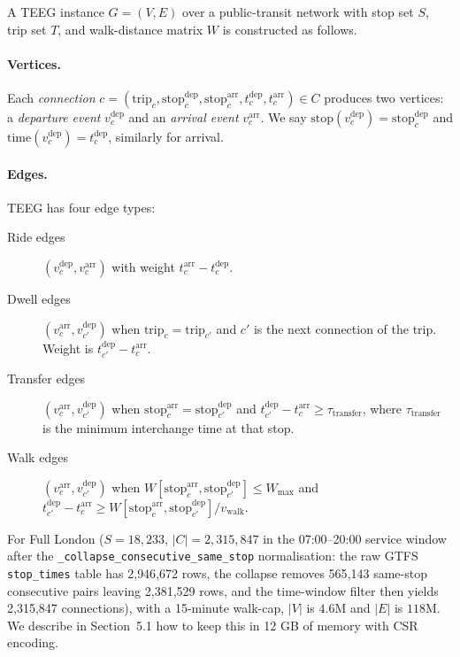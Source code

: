 \documentclass[letterpaper]{article}
\theoremstyle{definition}
\theoremstyle{plain}
\begin{document}
A TEEG instance $G = (V, E)$ over a public-transit network with stop set $S$,
trip set $T$, and walk-distance matrix $W$ is constructed as follows.

\paragraph{Vertices.} Each \emph{connection} $c = (\text{trip}_c,
\text{stop}^\text{dep}_c, \text{stop}^\text{arr}_c, t^\text{dep}_c,
t^\text{arr}_c) \in C$ produces two vertices: a \emph{departure event}
$v^\text{dep}_c$ and an \emph{arrival event} $v^\text{arr}_c$. We say
$\text{stop}(v^\text{dep}_c) = \text{stop}^\text{dep}_c$ and
$\text{time}(v^\text{dep}_c) = t^\text{dep}_c$, similarly for arrival.

\paragraph{Edges.} TEEG has four edge types:
\begin{description}
\item[Ride edges] $(v^\text{dep}_c, v^\text{arr}_c)$ with weight
$t^\text{arr}_c - t^\text{dep}_c$.
\item[Dwell edges] $(v^\text{arr}_c, v^\text{dep}_{c'})$ when
$\text{trip}_c = \text{trip}_{c'}$ and $c'$ is the next connection of the
trip. Weight is $t^\text{dep}_{c'} - t^\text{arr}_c$.
\item[Transfer edges] $(v^\text{arr}_c, v^\text{dep}_{c'})$ when
$\text{stop}^\text{arr}_c = \text{stop}^\text{dep}_{c'}$ and
$t^\text{dep}_{c'} - t^\text{arr}_c \geq \tau_\text{transfer}$, where
$\tau_\text{transfer}$ is the minimum interchange time at that stop.
\item[Walk edges] $(v^\text{arr}_c, v^\text{dep}_{c'})$ when
$W[\text{stop}^\text{arr}_c, \text{stop}^\text{dep}_{c'}] \leq W_\text{max}$
and $t^\text{dep}_{c'} - t^\text{arr}_c \geq W[\text{stop}^\text{arr}_c,
\text{stop}^\text{dep}_{c'}] / v_\text{walk}$.
\end{description}

For Full London ($S = 18{,}233$, $|C| = 2{,}315{,}847$ in the
07:00--20:00 service window after the
\texttt{\_collapse\_consecutive\_same\_stop} normalisation: the raw
GTFS \texttt{stop\_times} table has 2{,}946{,}672 rows, the collapse
removes 565{,}143 same-stop consecutive pairs leaving 2{,}381{,}529
rows, and the time-window filter then yields 2{,}315{,}847
connections), with a 15-minute walk-cap, $|V|$ is $4.6$M and $|E|$
is $118$M. We describe in Section~5.1 how to keep this in 12 GB of
memory with CSR encoding.
\end{document}
